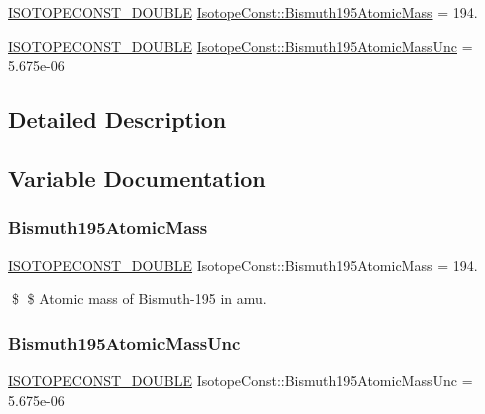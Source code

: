 \begin{DoxyCompactItemize}
\item 
\mbox{\hyperlink{group___isotope_const-_macros_ga8f45a7272ce02c0b4c65c44636ed719a}{I\+S\+O\+T\+O\+P\+E\+C\+O\+N\+S\+T\+\_\+\+D\+O\+U\+B\+LE}} \mbox{\hyperlink{group___isotope_const-_bismuth-_bi195_ga620fed79a1efc0ef8db00483f0f8625d}{Isotope\+Const\+::\+Bismuth195\+Atomic\+Mass}} = 194.
\item 
\mbox{\hyperlink{group___isotope_const-_macros_ga8f45a7272ce02c0b4c65c44636ed719a}{I\+S\+O\+T\+O\+P\+E\+C\+O\+N\+S\+T\+\_\+\+D\+O\+U\+B\+LE}} \mbox{\hyperlink{group___isotope_const-_bismuth-_bi195_ga0b6aa8ec2137ba9041dd7c22bb9247ff}{Isotope\+Const\+::\+Bismuth195\+Atomic\+Mass\+Unc}} = 5.\+675e-\/06
\end{DoxyCompactItemize}


\subsection{Detailed Description}


\subsection{Variable Documentation}
\mbox{\label{group___isotope_const-_bismuth-_bi195_ga620fed79a1efc0ef8db00483f0f8625d}} 
\subsubsection{\texorpdfstring{Bismuth195\+Atomic\+Mass}{Bismuth195AtomicMass}}
{\footnotesize\ttfamily \mbox{\hyperlink{group___isotope_const-_macros_ga8f45a7272ce02c0b4c65c44636ed719a}{I\+S\+O\+T\+O\+P\+E\+C\+O\+N\+S\+T\+\_\+\+D\+O\+U\+B\+LE}} Isotope\+Const\+::\+Bismuth195\+Atomic\+Mass = 194.}

\$ \$ Atomic mass of Bismuth-\/195 in amu. \mbox{\label{group___isotope_const-_bismuth-_bi195_ga0b6aa8ec2137ba9041dd7c22bb9247ff}} 
\subsubsection{\texorpdfstring{Bismuth195\+Atomic\+Mass\+Unc}{Bismuth195AtomicMassUnc}}
{\footnotesize\ttfamily \mbox{\hyperlink{group___isotope_const-_macros_ga8f45a7272ce02c0b4c65c44636ed719a}{I\+S\+O\+T\+O\+P\+E\+C\+O\+N\+S\+T\+\_\+\+D\+O\+U\+B\+LE}} Isotope\+Const\+::\+Bismuth195\+Atomic\+Mass\+Unc = 5.\+675e-\/06}

